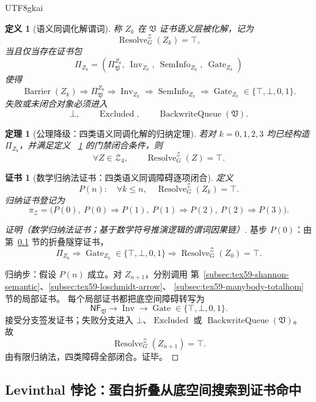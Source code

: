 \documentclass[12pt]{article}
\newtheorem{definition}{定义}[section]
\newtheorem{theorem}{定理}[section]
\newtheorem{Certificate}{证书}[section]
\newcommand{\Vsys}{\mathfrak V}
\newcommand{\NF}{\mathsf{NF}}
\DeclareMathOperator{\Resolve}{Resolve}
\DeclareMathOperator{\Barrier}{Barrier}
\DeclareMathOperator{\Gate}{Gate}
\DeclareMathOperator{\Inv}{Inv}
\DeclareMathOperator{\BackwriteQueue}{BackwriteQueue}
\DeclareMathOperator{\Excluded}{Excluded}
\DeclareMathOperator{\SemInfo}{SemInfo}
\begin{document}
\begin{CJK*}{UTF8}{gkai}
\begin{definition}[语义同调化解谓词]
\label{def:tex59-z4-resolution}
称 \(Z_k\) 在 \(\Vsys\) 证书语义层被化解，记为
\[
  \Resolve_G^{\mathcal Z}(Z_k)=\top,
\]
当且仅当存在证书包
\[
  \Pi_{Z_k}
  =
  \left(
  \Pi_{\Vsys}^{Z_k},\
  \Inv_{Z_k},\
  \SemInfo_{Z_k},\
  \Gate_{Z_k}
  \right)
\]
使得
\[
  \Barrier(Z_k)
  \Longrightarrow
  \Pi_{\Vsys}^{Z_k}
  \Longrightarrow
  \Inv_{Z_k}
  \Longrightarrow
  \SemInfo_{Z_k}
  \Longrightarrow
  \Gate_{Z_k}\in\{\top,\bot,0,1\}.
\]
失败或未闭合对象必须进入
\[
  \bot,\qquad \Excluded,\qquad \BackwriteQueue(\Vsys).
\]
\end{definition}

\begin{theorem}[公理降级：四类语义同调化解的归纳定理]
\label{thm:tex59-z4-induction}
若对 \(k=0,1,2,3\) 均已经构造 \(\Pi_{Z_k}\)，并满足定义
~\ref{def:tex59-z4-resolution} 的门禁闭合条件，则
\[
  \forall Z\in\mathcal Z_4,\qquad
  \Resolve_G^{\mathcal Z}(Z)=\top.
\]
\end{theorem}

\begin{Certificate}[数学归纳法证书：四类语义同调障碍逐项闭合]
\label{cert:tex59-z4-induction}
定义
\[
  P(n):\quad
  \forall k\le n,\quad
  \Resolve_G^{\mathcal Z}(Z_k)=\top.
\]
归纳证书登记为
\[
  \pi_{\mathcal Z}
  =
  \bigl(P(0),\
  P(0)\Rightarrow P(1),\
  P(1)\Rightarrow P(2),\
  P(2)\Rightarrow P(3)\bigr).
\]
\end{Certificate}

\begin{proof}[证明（数学归纳法证书；基于数学符号推演逻辑的谓词因果链）]
基步 \(P(0)\)：由第~\ref{subsec:tex59-levinthal} 节的折叠隧穿证书，
\[
  \Pi_{Z_0}\Rightarrow\Gate_{Z_0}\in\{\top,\bot,0,1\}
  \Rightarrow
  \Resolve_G^{\mathcal Z}(Z_0)=\top.
\]

归纳步：假设 \(P(n)\) 成立。对 \(Z_{n+1}\)，分别调用
第~\ref{subsec:tex59-shannon-semantic}、\ref{subsec:tex59-loschmidt-arrow}、
\ref{subsec:tex59-manybody-totalhom} 节的局部证书。
每个局部证书都把底空间障碍转写为
\[
  \NF_{\Vsys}
  \to
  \Inv
  \to
  \Gate\in\{\top,\bot,0,1\}.
\]
接受分支签发证书；失败分支进入 \(\bot\)、\(\Excluded\) 或 \(\BackwriteQueue(\Vsys)\)。
故
\[
  \Resolve_G^{\mathcal Z}(Z_{n+1})=\top.
\]
由有限归纳法，四类障碍全部闭合。证毕。
\end{proof}

\subsection{Levinthal 悖论：蛋白折叠从底空间搜索到证书命中}
\label{subsec:tex59-levinthal}


\end{CJK*}
\end{document}
